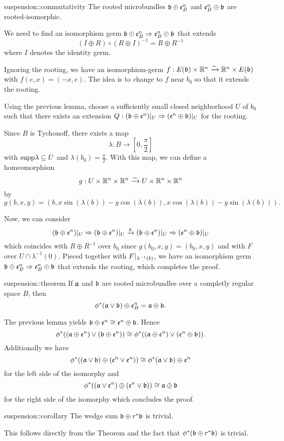 \begin{mylemma}{suspension::commutativity}
    The rooted microbundles $\mathfrak{b} \oplus \mathfrak{e}^{n}_B$ and $\mathfrak{e}^{n}_B \oplus \mathfrak{b}$ are rooted-isomorphic. 
\end{mylemma}
\begin{myproof}
    We need to find an isomorphism germ $\mathfrak{b} \oplus \mathfrak{e}^{n}_B \Rightarrow{} \mathfrak{e}^{n}_B \oplus \mathfrak{b}$ that extends
    \[ (I \oplus R) \circ (R \oplus I)^{-1} = R \oplus R^{-1} \]
    where $I$ denotes the identity germ.

    Ignoring the rooting, we have an isomorphism-germ $f: E(\mathfrak{b}) \times \mathbb{R}^n \xrightarrow{\sim} \mathbb{R}^n \times E(\mathfrak{b})$ with $f(e, x) = (-x, e)$.
    The idea is to change to $f$ near $b_0$ so that it extends the rooting.

    Using the previous lemma, choose a sufficiently small closed neighborhood $U$ of $b_0$
    such that there exists an extension $Q: (\mathfrak{b} \oplus \mathfrak{e}^{n})\vert_{U} \Rightarrow{}{} (\mathfrak{e}^{n} \oplus \mathfrak{b})\vert_{U}$ for the rooting.

    Since $B$ is Tychonoff, there exists a map
    \[ \lambda: B \to [0, \frac{\pi}{2}] \]
    with $\text{supp} \lambda \subseteq{} U$ and $\lambda(b_0) = \frac{\pi}{2}$.
    With this map, we can define a homeomorphism
    \[ g: U \times \mathbb{R}^n \times \mathbb{R}^n \xrightarrow{\sim} U \times \mathbb{R}^n \times \mathbb{R}^n \]
    by
    \[ g(b, x, y) = (b, x \sin(\lambda(b)) - y \cos(\lambda(b)), x \cos(\lambda(b)) - y \sin(\lambda(b))). \]

    Now, we can consider
    \[ (\mathfrak{b} \oplus \mathfrak{e}^{n})\vert_{U} \Rightarrow{} (\mathfrak{b} \oplus \mathfrak{e}^{n})\vert_{U} \xrightarrow{g} (\mathfrak{b} \oplus \mathfrak{e}^{n})\vert_{U} \Rightarrow{} (\mathfrak{e}^{n} \oplus \mathfrak{b})\vert_{U}\]
    which coincides with $R \oplus R^{-1}$ over $b_0$ since $g(b_0, x, y) = (b_0, x, y)$ and with $F$ over $U \cap \lambda^{-1}(0)$.
    Pieced together with $F\vert_{\lambda^{-1}(b)}$, we have an isomorphism germ $\mathfrak{b} \oplus \mathfrak{e}^{n}_B \Rightarrow{} \mathfrak{e}^{n}_B \oplus \mathfrak{b}$ that extends the rooting, which completes the proof.
\end{myproof}

\begin{mytheorem}{suspension::theorem}
    If $\mathfrak{a}$ and $\mathfrak{b}$ are rooted microbundles over a completly regular space $B$, then
    \[ \phi^*(\mathfrak{a} \vee \mathfrak{b}) \oplus \mathfrak{e}^{n}_B = \mathfrak{a} \oplus \mathfrak{b}. \]
\end{mytheorem}
\begin{myproof}
    The previous lemma yields $\mathfrak{b} \oplus \mathfrak{e}^{n} \cong \mathfrak{e}^{n} \oplus \mathfrak{b}$.
    Hence
    \[ \phi^*((\mathfrak{a} \oplus \mathfrak{e}^{n}) \vee (\mathfrak{b} \oplus \mathfrak{e}^{n})) \cong \phi^*((\mathfrak{a} \oplus \mathfrak{e}^{n}) \vee (\mathfrak{e}^{n} \oplus \mathfrak{b})). \]
    Additionally we have
    \[ \phi^*((\mathfrak{a} \vee \mathfrak{b}) \oplus (\mathfrak{e}^{n} \vee \mathfrak{e}^{n})) \cong \phi^*(\mathfrak{a} \vee \mathfrak{b}) \oplus \mathfrak{e}^{n} \]
    for the left side of the isomorphy and
    \[ \phi^*((\mathfrak{a} \vee \mathfrak{e}^{n}) \oplus (\mathfrak{e}^{n} \vee \mathfrak{b})) \cong \mathfrak{a} \oplus \mathfrak{b}\]
    for the right side of the isomorphy which concludes the proof.
\end{myproof}

\begin{mycorollary}{suspension::corollary}
    The wedge sum $\mathfrak{b} \oplus r^*\mathfrak{b}$ is trivial.
\end{mycorollary}
\begin{myproof}
    This follows directly from the Theorem and the fact that $\phi^*(\mathfrak{b} \oplus r^*\mathfrak{b})$ is trivial.
\end{myproof}

